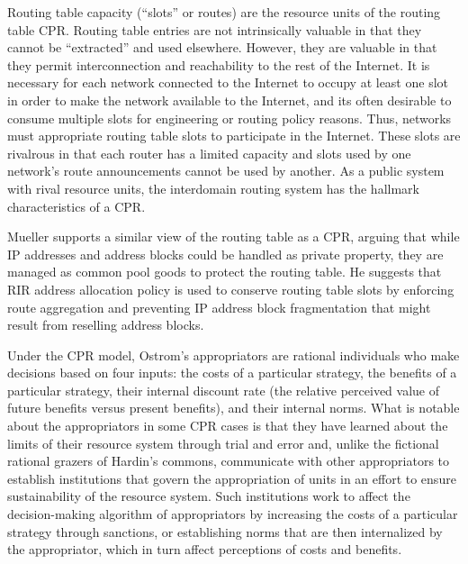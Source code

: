Routing table capacity (``slots'' or routes) are the resource units of the
routing table CPR. Routing table entries are not intrinsically valuable in that
they cannot be ``extracted'' and used elsewhere. However, they are valuable in
that they permit interconnection and reachability to the rest of the Internet.
It is necessary for each network connected to the Internet to occupy at least
one slot in order to make the network available to the Internet, and its often
desirable to consume multiple slots for engineering or routing policy reasons.
Thus, networks must appropriate routing table slots to participate in the
Internet. These slots are rivalrous in that each router has a limited capacity
and slots used by one network's route announcements cannot be used by another.
As a public system with rival resource units, the interdomain routing system
has the hallmark characteristics of a CPR.

Mueller \cite{Mueller:2010bh} supports a similar view of the routing table as a
CPR, arguing that while IP addresses and address blocks could be handled as
private property, they are managed as common pool goods to protect the routing
table. He suggests that RIR address allocation policy is used to conserve
routing table slots by enforcing route aggregation and preventing IP address
block fragmentation that might result from reselling address blocks.

Under the CPR model, Ostrom's appropriators are rational individuals who make
decisions based on four inputs: the costs of a particular strategy, the
benefits of a particular strategy, their internal discount rate (the relative
perceived value of future benefits versus present benefits), and their internal
norms. What is notable about the appropriators in some CPR cases is that they
have learned about the limits of their resource system through trial and error
and, unlike the fictional rational grazers of Hardin's commons, communicate
with other appropriators to establish institutions that govern the
appropriation of units in an effort to ensure sustainability of the resource
system. Such institutions work to affect the decision-making algorithm of
appropriators by increasing the costs of a particular strategy through
sanctions, or establishing norms that are then internalized by the
appropriator, which in turn affect perceptions of costs and benefits.


